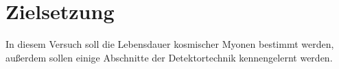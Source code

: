 \section{Zielsetzung}
\label{sec:zielsetzung}
In diesem Versuch soll die Lebensdauer kosmischer Myonen bestimmt werden, außerdem sollen einige Abschnitte der Detektortechnik kennengelernt werden.
